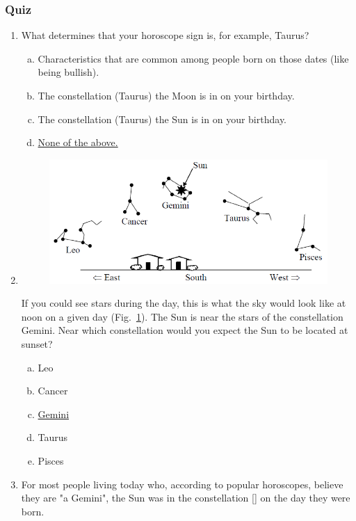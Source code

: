 \documentclass[12pt]{article}
\begin{document}
\subsubsection{Quiz}
\begin{enumerate}
\item
What determines that your horoscope sign is, for example, Taurus?
\begin{enumerate}[a.]
    \item Characteristics that are common among people born on those dates (like being bullish).
    \item The constellation (Taurus) the Moon is in on your birthday.
    \item The constellation (Taurus) the Sun is in on your birthday.
    \item \underline{None of the above.}
\end{enumerate}
\item
\begin{figure}[htbp]
    \centering
    \includegraphics{asq8.png}
    \caption{}
    \label{fig:l7q2}
\end{figure}
If you could see stars during the day, this is what the sky would look like at noon on a given day (Fig.~\ref{fig:l7q2}). The Sun is near the stars of the constellation Gemini. Near which constellation would you expect the Sun to be located at sunset?
\begin{enumerate}[a.]
    \item Leo
    \item Cancer
    \item \underline{Gemini}
    \item Taurus
    \item Pisces
\end{enumerate}
\item
For most people living today who, according to popular horoscopes, believe they are "a Gemini", the Sun was in the constellation [] on the day they were born.

\end{enumerate}
\end{document}
